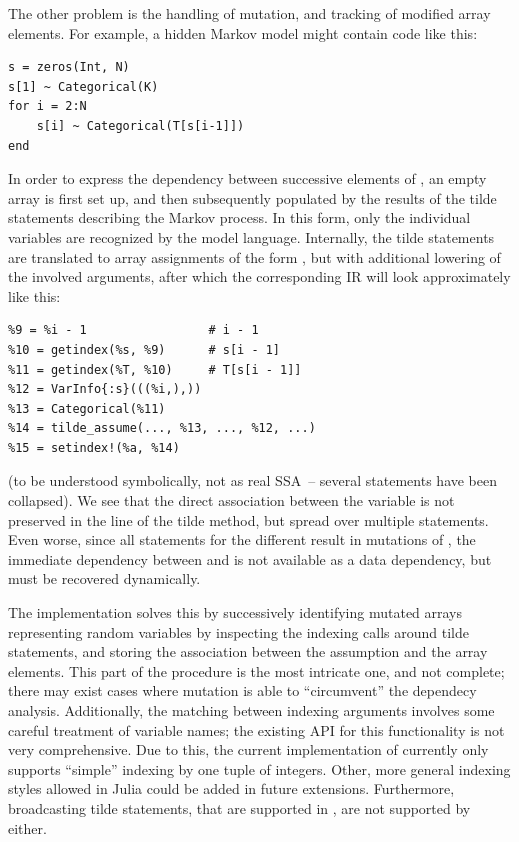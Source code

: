 The other problem is the handling of mutation, and tracking of modified array elements.  For
example, a hidden Markov model might contain code like this:
\begin{lstlisting}
s = zeros(Int, N)
s[1] ~ Categorical(K)
for i = 2:N
    s[i] ~ Categorical(T[s[i-1]])
end
\end{lstlisting}
In order to express the dependency between successive elements of , an empty array is first
set up, and then subsequently populated by the results of the tilde statements describing the Markov
process.  In this form, only the individual variables  are recognized by the model
language.  Internally, the tilde statements are translated to array assignments of the form
, but with additional lowering of the involved arguments, after
which the corresponding IR will look approximately like this:
\begin{lstlisting}
%9 = %i - 1                 # i - 1
%10 = getindex(%s, %9)      # s[i - 1]
%11 = getindex(%T, %10)     # T[s[i - 1]]
%12 = VarInfo{:s}(((%i,),))
%13 = Categorical(%11)
%14 = tilde_assume(..., %13, ..., %12, ...)
%15 = setindex!(%a, %14)
\end{lstlisting}
(to be understood symbolically, not as real SSA~-- several statements have been collapsed).  We see
that the direct association between the variable  is not preserved in the line of the tilde
method, but spread over multiple statements. Even worse, since all statements for the different
 result in mutations of , the immediate dependency between  and
 is not available as a data dependency, but must be recovered dynamically.

The  implementation solves this by successively identifying mutated arrays
representing random variables by inspecting the indexing calls around tilde statements, and storing
the association between the assumption and the array elements.  This part of the procedure is the
most intricate one, and not complete; there may exist cases where mutation is able to
\enquote{circumvent} the dependecy analysis.  Additionally, the matching between indexing arguments
involves some careful treatment of variable names; the existing \dppljl{} API for this functionality
is not very comprehensive.  Due to this, the current implementation of \autogibbsjl{} currently only
supports \enquote{simple} indexing by one tuple of integers.  Other, more general indexing styles
allowed in Julia could be added in future extensions.  Furthermore, broadcasting tilde statements,
that are supported in \dppljl{}, are not supported by \autogibbsjl{} either.

